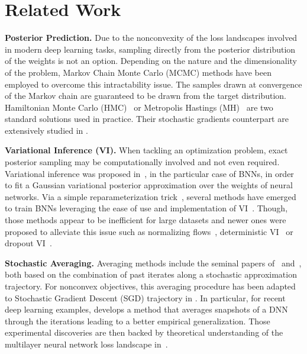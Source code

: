 \documentclass[tablecaption=bottom,wcp]{jmlr}
\begin{document}
\section{Related Work}\label{sec:related}

\textbf{Posterior Prediction.}
Due to the nonconvexity of the loss landscapes involved in modern deep learning tasks, sampling directly from the posterior distribution of the weights is not an option.
Depending on the nature and the dimensionality of the problem, Markov Chain Monte Carlo (MCMC) methods have been employed to overcome this intractability issue.
The samples drawn at convergence of the Markov chain are guaranteed to be drawn from the target distribution.
Hamiltonian Monte Carlo (HMC)~\citep{neal2011mcmc} or Metropolis Hastings (MH)~\citep{hastings1970monte} are two standard solutions used in practice.
Their stochastic gradients counterpart are extensively studied in \citep{ma2015complete}.

\vspace{0.08in}
\noindent \textbf{Variational Inference (VI).}
When tackling an optimization problem, exact posterior sampling may be computationally involved and not even required.
Variational inference was proposed in~\citep{graves2011practical}, in the particular case of BNNs, in order to fit a Gaussian variational posterior approximation over the weights of neural networks.
Via a simple reparameterization trick~\citep{blundell2015weight}, several methods have emerged to train BNNs leveraging the ease of use and implementation of VI~\citep{kingma2015variational,blundell2015weight,molchanov2017variational}.
Though, those methods appear to be inefficient for large datasets and newer ones were proposed to alleviate this issue such as normalizing flows~\citep{louizos2017multiplicative}, deterministic VI~\citep{wu2018deterministic} or dropout VI~\citep{gal2016dropout}.

\vspace{0.08in}
\noindent \textbf{Stochastic Averaging.}
Averaging methods include the seminal papers of~\citep{polyak1990sa} and~\citep{ruppert1988efficient}, both based on the combination of past iterates along a stochastic approximation trajectory.
For nonconvex objectives, this averaging procedure has been adapted to Stochastic Gradient Descent (SGD) trajectory in \citep{zhou2017convergence}.
In particular, for recent deep learning examples, \citet{izmailov2018averaging} develops a  method that averages snapshots of a DNN through the iterations leading to a better empirical generalization.
Those experimental discoveries are then backed by theoretical understanding of the multilayer neural network loss landscape in~\citep{keskar2016large,he2019asymmetric}.
\end{document}
